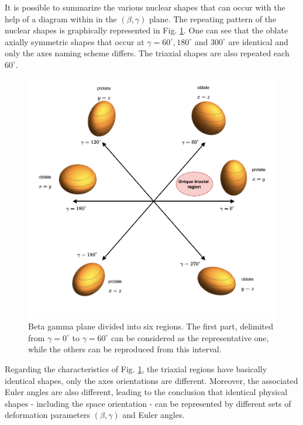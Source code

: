 It is possible to summarize the various nuclear shapes that can occur with the help of a diagram within in the $(\beta,\gamma)$ plane. The repeating pattern of the nuclear shapes is graphically represented in Fig. \ref{beta-gamma-plane}. One can see that the oblate axially symmetric shapes that occur at $\gamma=60^\circ,180^\circ$ and $300^\circ$ are identical and only the axes naming scheme differs. The triaxial shapes are also repeated each $60^\circ$.

\begin{figure}
    \centering
    \includegraphics[scale=0.65]{Chapters/Figures/beta_gamma_plane.pdf}
    \caption{Beta gamma plane divided into six regions. The first part, delimited from $\gamma=0^\circ$ to $\gamma=60^\circ$ can be considered as the representative one, while the others can be reproduced from this interval.}
    \label{beta-gamma-plane}
\end{figure}

Regarding the characteristics of Fig. \ref{beta-gamma-plane}, the triaxial regions have basically identical shapes, only the axes orientations are different. Moreover, the associated Euler angles are also different, leading to the conclusion that identical physical shapes - including the space orientation - can be represented by different sets of deformation parameters $(\beta,\gamma)$ and Euler angles.

